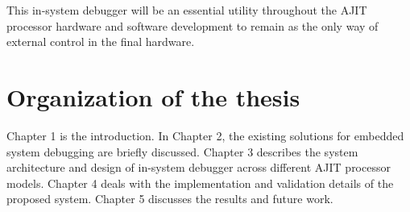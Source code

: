 This in-system debugger will be an essential utility throughout the AJIT processor hardware and software development to remain as the only way of external control in the final hardware.

\section{Organization of the thesis}

Chapter 1 is the introduction. In Chapter 2, the existing solutions for embedded system debugging are briefly discussed. Chapter 3 describes the system architecture and design of in-system debugger across different AJIT processor models. Chapter 4 deals with the implementation and validation details of the proposed system. Chapter 5 discusses the results and future work.

